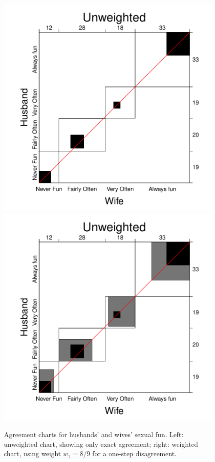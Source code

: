 \documentclass[11pt]{book}
\renewenvironment{knitrout}{\small\renewcommand{\baselinestretch}{.85}}{} %
\begin{document}
\begin{knitrout}
\color{fgcolor}\begin{kframe}
\begin{alltt}
 \hlstd{=}\hlstd{,} \hlstd{=}\hlstd{)}
 \hlstd{=}\hlstd{)}
\end{alltt}
\end{kframe}\begin{figure}[!htbp]


\centerline{\includegraphics[width=.48\textwidth]{ch04/fig/sexfun-agree1} 
\includegraphics[width=.48\textwidth]{ch04/fig/sexfun-agree2} }

\caption[Agreement charts for husbands' and wives' sexual fun]{Agreement charts for husbands' and wives' sexual fun. Left: unweighted chart, showing only exact agreement; right: weighted chart, using weight $w_1 = 8/9$ for a one-step disagreement.\label{fig:sexfun-agree}}
\end{figure}


\end{knitrout}
\end{document}

